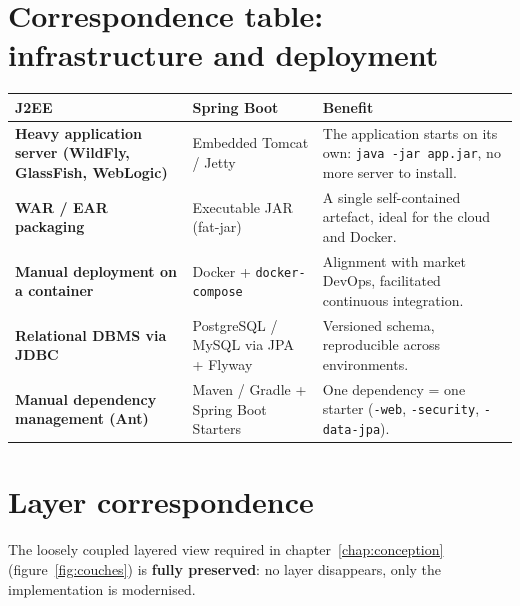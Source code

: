 \section{Correspondence table: infrastructure and deployment}
\begin{xltabular}{\textwidth}{>{\bfseries}p{4cm} p{4.5cm} X}
\toprule
\textbf{J2EE} & \textbf{Spring Boot} & \textbf{Benefit} \\
\midrule
\endhead
Heavy application server (WildFly, GlassFish, WebLogic) & Embedded Tomcat / Jetty & The application starts on its own: \texttt{java -jar app.jar}, no more server to install. \\
WAR / EAR packaging & Executable JAR (fat-jar) & A single self-contained artefact, ideal for the cloud and Docker. \\
Manual deployment on a container & Docker + \texttt{docker-compose} & Alignment with market DevOps, facilitated continuous integration. \\
Relational DBMS via JDBC & PostgreSQL / MySQL via JPA + Flyway & Versioned schema, reproducible across environments. \\
Manual dependency management (Ant) & Maven / Gradle + Spring Boot Starters & One dependency = one starter (\texttt{-web}, \texttt{-security}, \texttt{-data-jpa}). \\
\bottomrule
\end{xltabular}

\section{Layer correspondence}
The loosely coupled layered view required in chapter~\ref{chap:conception}
(figure~\ref{fig:couches}) is \textbf{fully preserved}: no layer disappears, only
the implementation is modernised.


